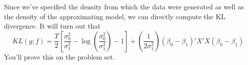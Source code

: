 \documentclass[12pt]{article}
\theoremstyle{definition}
\begin{document}
Since we've specified the density from which the data were generated as well as the density of the approximating model, we can directly compute the KL divergence. It will turn out that
	$$KL(g;f) =  \frac{T}{2}\left[\frac{\sigma_0^2}{\sigma_1^2} - \log\left(\frac{\sigma_0^2}{\sigma_1^2}\right) - 1 \right] + \left(\frac{1}{2 \sigma_1^2}\right)\left(\beta_0 - \beta_1\right)'X'X\left(\beta_0 - \beta_1\right)$$
You'll prove this on the problem set.
\end{document}
